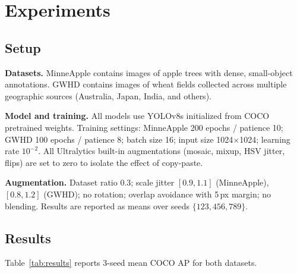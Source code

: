 \documentclass[conference]{IEEEtran}
\begin{document}
\section{Experiments}

\subsection{Setup}

\textbf{Datasets.}
MinneApple contains
images of apple trees with dense, small-object
annotations. GWHD contains
images of wheat fields collected across multiple
geographic sources (Australia, Japan, India, and others).

\textbf{Model and training.} All models use YOLOv8s
initialized from COCO pretrained weights. Training
settings: MinneApple 200 epochs / patience 10; GWHD 100
epochs / patience 8; batch size 16; input size
1024$\times$1024; learning rate $10^{-2}$.
All Ultralytics built-in augmentations (mosaic, mixup,
HSV jitter, flips) are set to zero to isolate the
effect of copy-paste.

\textbf{Augmentation.} Dataset ratio 0.3; scale jitter
$[0.9,1.1]$ (MinneApple), $[0.8,1.2]$ (GWHD); no
rotation; overlap avoidance with 5\,px margin; no
blending. Results are reported as means over seeds
$\{123,456,789\}$.

\subsection{Results}

Table~\ref{tab:results} reports 3-seed mean COCO AP
for both datasets.
\end{document}
